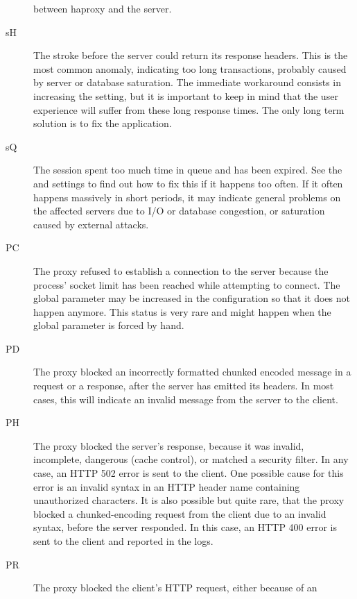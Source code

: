 \begin{description}
          between haproxy and the server.
     \item[sH]
          The  stroke before the server could return its
          response headers. This is the most common anomaly, indicating too
          long transactions, probably caused by server or database saturation.
          The immediate workaround consists in increasing the 
          setting, but it is important to keep in mind that the user experience
          will suffer from these long response times. The only long term
          solution is to fix the application.
     \item[sQ]
          The session spent too much time in queue and has been expired. See
          the  and  settings to find out how to
          fix this if it happens too often. If it often happens massively in
          short periods, it may indicate general problems on the affected
          servers due to I/O or database congestion, or saturation caused by
          external attacks.
     \item[PC]
          The proxy refused to establish a connection to the server because the
          process' socket limit has been reached while attempting to connect.
          The global  parameter may be increased in the configuration
          so that it does not happen anymore. This status is very rare and
          might happen when the global  parameter is forced by hand.
     \item[PD]
          The proxy blocked an incorrectly formatted chunked encoded message in
          a request or a response, after the server has emitted its headers. In
          most cases, this will indicate an invalid message from the server to
          the client.
     \item[PH]
          The proxy blocked the server's response, because it was invalid,
          incomplete, dangerous (cache control), or matched a security filter.
          In any case, an HTTP 502 error is sent to the client. One possible
          cause for this error is an invalid syntax in an HTTP header name
          containing unauthorized characters. It is also possible but quite
          rare, that the proxy blocked a chunked-encoding request from the
          client due to an invalid syntax, before the server responded. In this
          case, an HTTP 400 error is sent to the client and reported in the
          logs.
     \item[PR]
          The proxy blocked the client's HTTP request, either because of an

\end{description}
